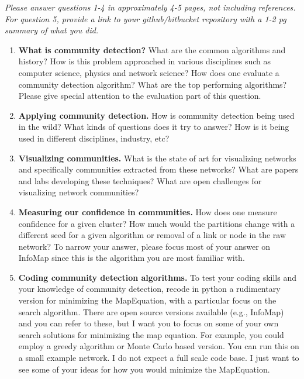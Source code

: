 \emph{Please answer questions 1-4 in approximately 4-5 pages, not
including references. For question 5, provide a link to your
github/bitbucket repository with a 1-2 pg summary of what you did.}

\begin{enumerate}
\def\labelenumi{\arabic{enumi}.}
\item
  \textbf{What is community detection?} What are the common algorithms
  and history? How is this problem approached in various disciplines
  such as computer science, physics and network science? How does one
  evaluate a community detection algorithm? What are the top performing
  algorithms? Please give special attention to the evaluation part of
  this question.
\item
  \textbf{Applying community detection.} How is community detection
  being used in the wild? What kinds of questions does it try to answer?
  How is it being used in different disciplines, industry, etc?
\item
  \textbf{Visualizing communities.} What is the state of art for
  visualizing networks and specifically communities extracted from these
  networks? What are papers and labs developing these techniques? What
  are open challenges for visualizing network communities?
\item
  \textbf{Measuring our confidence in communities.} How does one measure
  confidence for a given cluster? How much would the partitions change
  with a different seed for a given algorithm or removal of a link or
  node in the raw network? To narrow your answer, please focus most of
  your answer on InfoMap since this is the algorithm you are most
  familiar with.
\item
  \textbf{Coding community detection algorithms.} To test your coding
  skills and your knowledge of community detection, recode in python a
  rudimentary version for minimizing the MapEquation, with a particular
  focus on the search algorithm. There are open source versions
  available (e.g., InfoMap) and you can refer to these, but I want you
  to focus on some of your own search solutions for minimizing the map
  equation. For example, you could employ a greedy algorithm or Monte
  Carlo based version. You can run this on a small example network. I do
  not expect a full scale code base. I just want to see some of your
  ideas for how you would minimize the MapEquation.
\end{enumerate}
